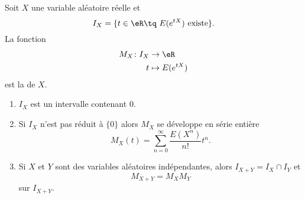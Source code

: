 \begin{theorem}
    Soit \( X\) une variable aléatoire réelle et
    \begin{equation}
        I_X=\{ t\in \eR\tq \text{ $E( e^{tX})$ existe}\}.
    \end{equation}
    La fonction
    \begin{equation}
        \begin{aligned}
            M_X\colon I_X&\to \eR \\
            t&\mapsto E( e^{tX}) 
        \end{aligned}
    \end{equation}
    est la  de \( X\). 
    \begin{enumerate}
        \item
            \( I_X\) est un intervalle contenant \( 0\).
        \item
            Si \( I_X\) n'est pas réduit à \( \{ 0 \}\) alors \( M_X\) se développe en série entière
            \begin{equation}
                M_X(t)=\sum_{n=0}^{\infty}\frac{ E(X^n) }{ n! }t^n.
            \end{equation}
        \item
            Si \( X\) et \( Y\) sont des variables aléatoires indépendantes, alors \( I_{X+Y}=I_X\cap I_Y\) et 
            \begin{equation}
                M_{X+Y}=M_XM_Y
            \end{equation}
            sur \( I_{X+Y}\).
    \end{enumerate}
\end{theorem}

